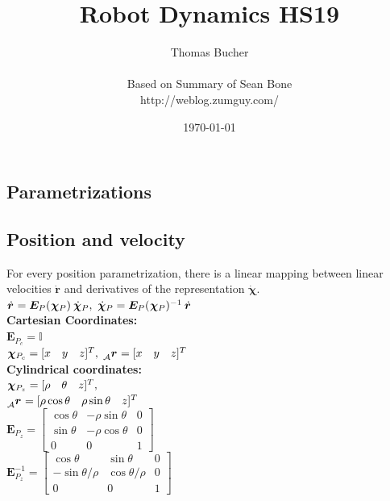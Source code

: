 \documentclass[a4paper, 8pt]{extarticle}
\title{Robot Dynamics HS19}
\author{Thomas Bucher \\ \ \\ Based on Summary of Sean Bone \\ http://weblog.zumguy.com/ }
\date{ \today }
\newcommand{\mvec}[3]{  \prescript{}{\mathcal{#1}}{\bm{#2}}  _{#3} }
\newcommand{\mdvec}[3]{ \prescript{}{\mathcal{#1}}{\dot{\bm #2}} _{#3} }
\begin{document}
\begin{multicols*}{3}

\maketitle


\section{Parametrizations}
\subsection{Position and velocity}
For every position parametrization, there is a linear mapping between linear velocities $\dot{\bm{r}}$ and derivatives of the representation $\dot{\bm{\chi}}$.\\
$\mdvec{}{r}{} = \bm{E}_P(\mvec{}{\chi}{P})\mdvec{}{\chi}{P},\; \mdvec{}{\chi}{P} = \bm{E}_P(\mvec{}{\chi}{P})^{-1}\mdvec{}{r}{}$\\

\noindent\textbf{Cartesian Coordinates:}\\
$\bm{E}_{P_c} = \mathbb{I}$\\
$\mvec{}{\chi}{P_c} = [x \quad y \quad z]^T,\; \mvec{A}{r}{} = [x \quad y \quad z]^T$\\

\noindent\textbf{Cylindrical coordinates:}\\
$\mvec{}{\chi}{P_z} = [\rho \quad \theta \quad z]^T,$\\
$\mvec{A}{r}{} = [\rho\cos\theta \quad \rho\sin\theta \quad z]^T$\\
$\bm E_{P_z} = 
\left[\begin{smallmatrix} 
\cos\theta  &  -\rho\sin\theta  &  0\\
\sin\theta  &  -\rho\cos\theta  &  0\\
0 & 0 & 1
\end{smallmatrix}\right]$\\
$\bm E_{P_z}^{-1} = 
\left[\begin{smallmatrix} 
\cos\theta  &  \sin\theta  &  0\\
-\sin\theta/\rho  &  \cos\theta/\rho  &  0\\
0 & 0 & 1
\end{smallmatrix}\right]$\\


\end{multicols*}
\end{document}
